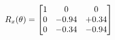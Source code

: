 \documentclass[preview]{standalone}
\begin{document}
\begin{align*}
\special{dvisvgm:raw <g id='unique000'>}R_{x}(\theta) = \begin{bmatrix}1 & 0 & 0 \\0 & -0.94 & +0.34 \\0 & -0.34 & -0.94\end{bmatrix}\special{dvisvgm:raw </g>}
\end{align*}
\end{document}
